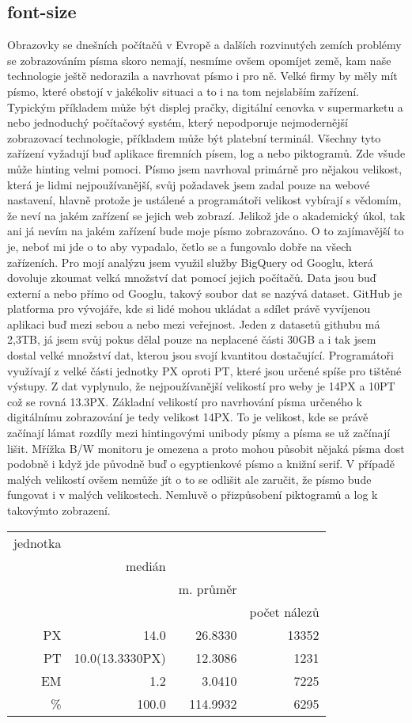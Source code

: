 \documentclass{article}
\begin{document}
\subsection{font-size}
Obrazovky se dnešních počítačů v Evropě a dalších rozvinutých zemích problémy se zobrazováním písma skoro nemají, nesmíme ovšem opomíjet země, kam naše technologie ještě nedorazila a navrhovat písmo i pro ně. Velké firmy by měly mít písmo, které obstojí v jakékoliv situaci a to i na tom nejslabším zařízení. Typickým příkladem může být displej pračky, digitální cenovka v supermarketu a nebo jednoduchý počítačový systém, který nepodporuje nejmodernější zobrazovací technologie, příkladem může být platební terminál. Všechny tyto zařízení vyžadují buď aplikace firemních písem, log a nebo piktogramů. Zde všude může hinting velmi pomoci. Písmo jsem navrhoval primárně pro nějakou velikost, která je lidmi nejpoužívanější, svůj požadavek jsem zadal pouze na webové nastavení, hlavně protože je ustálené a programátoři velikost vybírají s vědomím, že neví na jakém zařízení se jejich web zobrazí. Jelikož jde o akademický úkol, tak ani já nevím na jakém zařízení bude moje písmo zobrazováno. O to zajímavější to je, neboť mi jde o to aby vypadalo, četlo se a fungovalo dobře na všech zařízeních. Pro mojí analýzu jsem využil služby BigQuery od Googlu, která dovoluje zkoumat velká množství dat pomocí jejich počítačů. Data jsou buď externí a nebo přímo od Googlu, takový soubor dat se nazývá dataset. GitHub je platforma pro vývojáře, kde si lidé mohou ukládat a sdílet právě vyvíjenou aplikaci buď mezi sebou a nebo mezi veřejnost. Jeden z datasetů githubu má 2,3TB, já jsem svůj pokus dělal pouze na neplacené části 30GB a i tak jsem dostal velké množství dat, kterou jsou svojí kvantitou dostačující. Programátoři využívají z velké části jednotky PX oproti PT, které jsou určené spíše pro tištěné výstupy. Z dat vyplynulo, že nejpoužívanější velikostí pro weby je 14PX a 10PT což se rovná 13.3PX. Základní velikostí pro navrhování písma určeného k digitálnímu zobrazování je tedy velikost 14PX. To je velikost, kde se právě začínají lámat rozdíly mezi hintingovými unibody písmy a písma se už začínají lišit. Mřížka B/W monitoru je omezena a proto mohou působit nějaká písma dost podobně i když jde původně buď o egyptienkové písmo a knižní serif. V případě malých velikostí ovšem nemůže jít o to se odlišit ale zaručit, že písmo bude fungovat i v malých velikostech. Nemluvě o přizpůsobení piktogramů a log k takovýmto zobrazení.

\begin{tabular}{r|rrr}
jednotka & \\
& medián & \\
& & m. průměr & \\
& & & počet nálezů\\
\midrule
PX & 14.0 & 26.8330 &13352 \\
PT & 10.0(13.3330PX)  & 12.3086 & 1231 \\
EM & 1.2 & 3.0410 & 7225 \\
\% & 100.0 & 114.9932 & 6295\\
\end{tabular}
\end{document}
